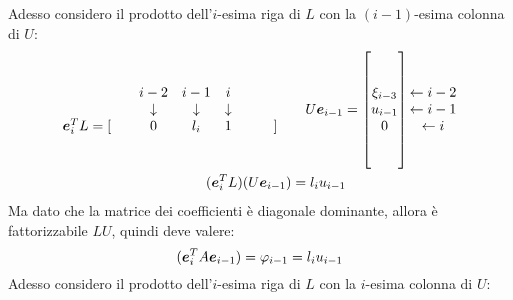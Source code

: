 Adesso considero il prodotto dell'$i$-esima riga di $L$ con la $(i-1)$-esima
colonna di $U$:
\begin{displaymath}
\begin{split}
	\begin{matrix}
		& & i-2 & i-1 & i  \\
		& & \downarrow & \downarrow & \downarrow \\
		\boldsymbol{e}_{i}^{T}L = [& & 0 & l_{i} & 1 & & &]
	\end{matrix}
	\quad & \quad
	U \boldsymbol{e}_{i-1} = \begin{bmatrix}
		\\ 
		\\ 
		\xi_{i-3} \\ 
		u_{i-1} \\
		0 \\
	 	\\
	 	\\
	\end{bmatrix} 
	\begin{matrix}
		\\ 
		\\ 
		\leftarrow i-2 \\ 
		\leftarrow i-1 \\
		\leftarrow i \\
	 	\\
	 	\\
	\end{matrix} \\
	(\boldsymbol{e}_{i}^{T}L )(U \boldsymbol{e}_{i-1}) &= l_{i} u_{i-1}
\end{split}
\end{displaymath}
Ma dato che la matrice dei coefficienti \`e diagonale dominante, allora \`e
fattorizzabile $LU$, quindi deve valere:
\begin{displaymath}
	(\boldsymbol{e}_{i}^{T} A \boldsymbol{e}_{i-1}) = \varphi_{i-1} = l_{i} u_{i-1}
\end{displaymath}
Adesso considero il prodotto dell'$i$-esima riga di $L$ con la $i$-esima
colonna di $U$:
